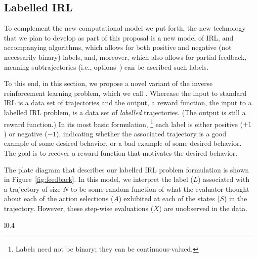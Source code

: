 
\subsection{Labelled IRL}
\label{sec:feedback}

To complement the new computational model we put forth, the new
technology that we plan to develop as part of this proposal is a new
model of IRL, and accompanying algorithms, which allows for both
positive and negative (not necessarily binary) labels, and, moreover,
which also allows for partial feedback, meaning subtrajectories (i.e.,
options~\cite{sutton99}) can be ascribed such labels.

To this end, in this section, we propose a novel variant of the
inverse reinforcement learning problem, which we call .  Wherease the input to standard IRL is a data set of
trajectories
and the output, a reward function, the input to a labelled IRL
problem, is a data set of \emph{labelled\/} trajectories. (The output
is still a reward function.)  In its most basic formulation,%
\footnote{Labels need not be binary; they can be continuous-valued.}
each label is either positive ($+1$) or negative ($-1$), indicating
whether the associated trajectory is a good example of some desired
behavior, or a bad example of some desired behavior.  The goal is to
recover a reward function that motivates the desired behavior.

The plate diagram that describes our labelled IRL problem formulation
is shown in Figure~\ref{fig:feedback}.  In this model, we interpret
the label ($L$) associated with a trajectory of size $N$ to be some
random function of what the evaluator thought about each of the action
selections ($A$) exhibited at each of the states ($S$) in the
trajectory.  However, these step-wise evaluations ($X$) are unobserved
in the data.

\begin{wrapfigure}{l}{0.4\textwidth}
\caption{Feedback IRL}
\label{fig:feedback}
\end{wrapfigure}

